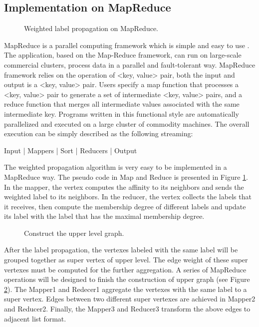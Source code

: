 \documentclass{acm_proc_article-sp}
\begin{document}
\subsection{Implementation on MapReduce}
\begin{figure}
\centering
{}
\caption{Weighted label propagation on MapReduce.}
\label{fig:wlp}
\end{figure}
MapReduce is a parallel computing framework which is simple and easy to use \cite{dean:mapreduce:}. The application, based on the Map-Reduce framework, can run on large-scale commercial clusters, process data in a parallel and fault-tolerant way. MapReduce framework relies on the operation of <key, value> pair, both the input and output is a <key, value> pair. Users specify a map function that processes a <key, value> pair to generate a set of intermediate <key, value> pairs, and a reduce function that merges all intermediate values associated with the same intermediate key. Programs written in this functional style are automatically parallelized and executed on a large cluster of commodity machines. The overall execution can be simply described as the following streaming:
\par
\begin{center}
Input | Mappers | Sort | Reducers | Output
\end{center}
\par
The weighted propagation algorithm is very easy to be implemented in a MapReduce way. The pseudo code in Map and Reduce is presented in Figure \ref{fig:wlp}. In the mapper, the vertex computes the affinity to its neighbors and sends the weighted label to its neighbors. In the reducer, the vertex collects the labels that it receives, then compute the membership degree of different labels and update its label with the label that has the maximal membership degree.
\begin{figure}
\centering
{}
\caption{Construct the upper level graph.}
\label{fig:upper}
\end{figure}


\par
After the label propagation, the vertexes labeled with the same label will be grouped together as super vertex of upper level. The edge weight of these super vertexes must be computed for the further aggregation. A series of MapReduce operations will be designed to finish the construction of upper graph (see Figure \ref{fig:upper}). The Mapper1 and Redecer1 aggregate the vertexes with the same label to a super vertex. Edges between two different super vertexes are achieved in Mapper2 and Reducer2. Finally, the Mapper3 and Reducer3 transform the above edges to adjacent list format.
\end{document}
